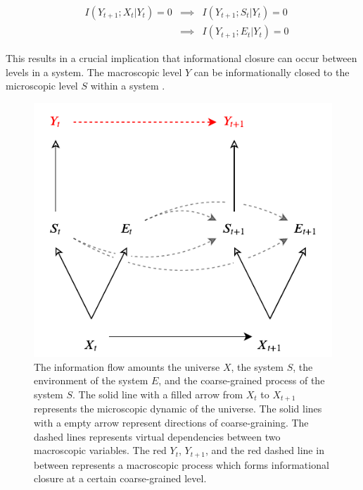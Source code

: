 \documentclass[utf8]{article}
\begin{document}
		\begin{equation}
			\label{eq:ICchain}
			\begin{aligned}
		    & I(Y_{t+1};X_t|Y_{t})=0 & \implies & I(Y_{t+1};S_t|Y_{t})=0 \\
		    & {} & \implies & I(Y_{t+1};E_t|Y_{t})=0
			\end{aligned}
		\end{equation}
        
        This results in a crucial implication that informational closure can occur between levels in a system. The macroscopic level $Y$ can be informationally closed to the microscopic level $S$ within a system \citep{PFANTE.2014}.

		\begin{figure}[H]
		    \centering
			\includegraphics[width=\textwidth]{WritingMaterials/Fig_FullGraph/FullGraph.pdf}
			\caption{The information flow amounts the universe $X$, the system $S$, the environment of the system $E$, and the coarse-grained process of the system $S$. The solid line with a filled arrow from $X_t$ to $X_{t+1}$ represents the microscopic dynamic of the universe. The solid lines with a empty arrow represent directions of coarse-graining. The dashed lines represents virtual dependencies between  two macroscopic variables. The red $Y_t$, $Y_{t+1}$, and the red dashed line in between represents a macroscopic process which forms informational closure at a certain coarse-grained level.}
			\label{fig:fullgraph}
	   	\end{figure}
       
\end{document}
